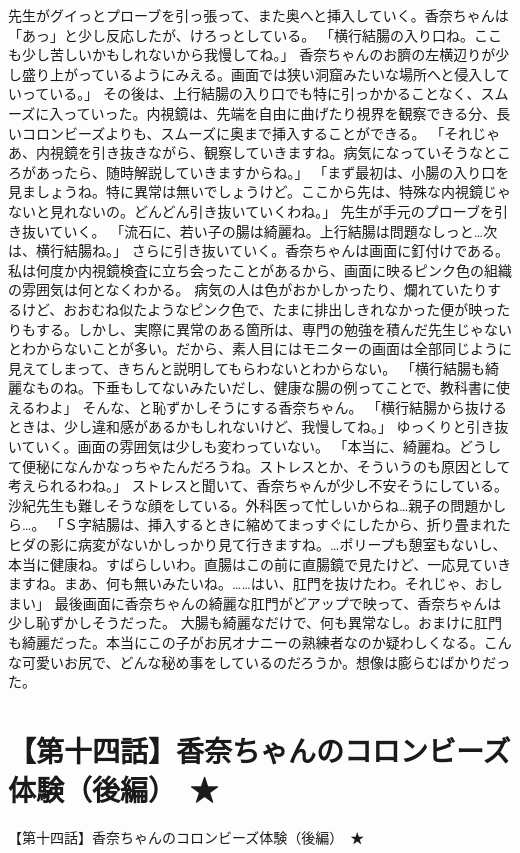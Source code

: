 先生がグイっとプローブを引っ張って、また奥へと挿入していく。香奈ちゃんは「あっ」と少し反応したが、けろっとしている。
「横行結腸の入り口ね。ここも少し苦しいかもしれないから我慢してね。」
香奈ちゃんのお臍の左横辺りが少し盛り上がっているようにみえる。画面では狭い洞窟みたいな場所へと侵入していっている。」
その後は、上行結腸の入り口でも特に引っかかることなく、スムーズに入っていった。内視鏡は、先端を自由に曲げたり視界を観察できる分、長いコロンビーズよりも、スムーズに奥まで挿入することができる。
「それじゃあ、内視鏡を引き抜きながら、観察していきますね。病気になっていそうなところがあったら、随時解説していきますからね。」
「まず最初は、小腸の入り口を見ましょうね。特に異常は無いでしょうけど。ここから先は、特殊な内視鏡じゃないと見れないの。どんどん引き抜いていくわね。」
先生が手元のプローブを引き抜いていく。
「流石に、若い子の腸は綺麗ね。上行結腸は問題なしっと…次は、横行結腸ね。」
さらに引き抜いていく。香奈ちゃんは画面に釘付けである。私は何度か内視鏡検査に立ち会ったことがあるから、画面に映るピンク色の組織の雰囲気は何となくわかる。
病気の人は色がおかしかったり、爛れていたりするけど、おおむね似たようなピンク色で、たまに排出しきれなかった便が映ったりもする。しかし、実際に異常のある箇所は、専門の勉強を積んだ先生じゃないとわからないことが多い。だから、素人目にはモニターの画面は全部同じように見えてしまって、きちんと説明してもらわないとわからない。
「横行結腸も綺麗なものね。下垂もしてないみたいだし、健康な腸の例ってことで、教科書に使えるわよ」
そんな、と恥ずかしそうにする香奈ちゃん。
「横行結腸から抜けるときは、少し違和感があるかもしれないけど、我慢してね。」
ゆっくりと引き抜いていく。画面の雰囲気は少しも変わっていない。
「本当に、綺麗ね。どうして便秘になんかなっちゃたんだろうね。ストレスとか、そういうのも原因として考えられるわね。」
ストレスと聞いて、香奈ちゃんが少し不安そうにしている。
沙紀先生も難しそうな顔をしている。外科医って忙しいからね…親子の問題かしら…。
「Ｓ字結腸は、挿入するときに縮めてまっすぐにしたから、折り畳まれたヒダの影に病変がないかしっかり見て行きますね。…ポリープも憩室もないし、本当に健康ね。すばらしいわ。直腸はこの前に直腸鏡で見たけど、一応見ていきますね。まあ、何も無いみたいね。……はい、肛門を抜けたわ。それじゃ、おしまい」
最後画面に香奈ちゃんの綺麗な肛門がどアップで映って、香奈ちゃんは少し恥ずかしそうだった。
大腸も綺麗なだけで、何も異常なし。おまけに肛門も綺麗だった。本当にこの子がお尻オナニーの熟練者なのか疑わしくなる。こんな可愛いお尻で、どんな秘め事をしているのだろうか。想像は膨らむばかりだった。


\section{【第十四話】香奈ちゃんのコロンビーズ体験（後編）　★}
【第十四話】香奈ちゃんのコロンビーズ体験（後編）　★


